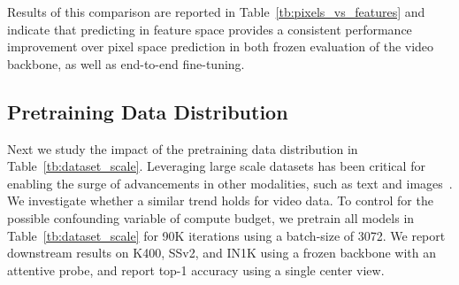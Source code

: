 \documentclass[twocolumn]{fairmeta}
\theoremstyle{plain}
\theoremstyle{definition}
\theoremstyle{remark}
\begin{document}
Results of this comparison are reported in Table~\ref{tb:pixels_vs_features} and indicate that predicting in feature space provides a consistent performance improvement over pixel space prediction in both frozen evaluation of the video backbone, as well as end-to-end fine-tuning.

\subsection{Pretraining Data Distribution}
Next we study the impact of the pretraining data distribution in Table~\ref{tb:dataset_scale}.
Leveraging large scale datasets has been critical for enabling the surge of advancements in other modalities, such as text and images~\citep{kaplan2020scaling, cherti2023reproducible}.
We investigate whether a similar trend holds for video data.
To control for the possible confounding variable of compute budget, we pretrain all models in Table~\ref{tb:dataset_scale} for 90K iterations using a batch-size of 3072.
We report downstream results on K400, SSv2, and IN1K using a frozen backbone with an attentive probe, and report top-1 accuracy using a single center view.
\end{document}
